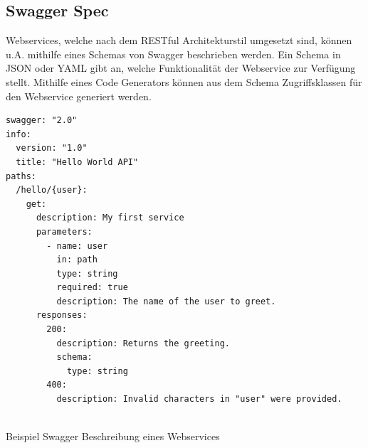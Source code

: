 \subsection{Swagger Spec}
Webservices, welche nach dem RESTful Architekturstil umgesetzt sind, können u.A. mithilfe eines Schemas von Swagger beschrieben werden. Ein Schema in JSON oder YAML gibt an, welche Funktionalität der Webservice zur Verfügung stellt. Mithilfe eines Code Generators können aus dem Schema Zugriffsklassen für den Webservice generiert werden.

\begin{listing}[H]
\begin{verbatim}
swagger: "2.0"
info:
  version: "1.0"
  title: "Hello World API"
paths:
  /hello/{user}:
    get:
      description: My first service
      parameters:
        - name: user
          in: path
          type: string
          required: true
          description: The name of the user to greet.
      responses:
        200:
          description: Returns the greeting.
          schema:
            type: string
        400:
          description: Invalid characters in "user" were provided.
          
\end{verbatim}
\caption{Beispiel Swagger Beschreibung eines Webservices}
\end{listing}
